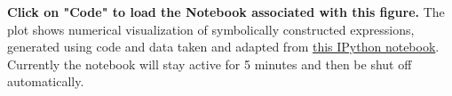 \textbf{\label{fig:2}} \textbf{Click on "Code" to load the Notebook associated with this figure.} The plot shows numerical visualization of symbolically constructed expressions, generated using code and data taken and adapted from \href{http://nbviewer.ipython.org/static/img/example-nb/sympy.png}{this IPython notebook}.  Currently the notebook will stay active for 5 minutes and then be shut off automatically.